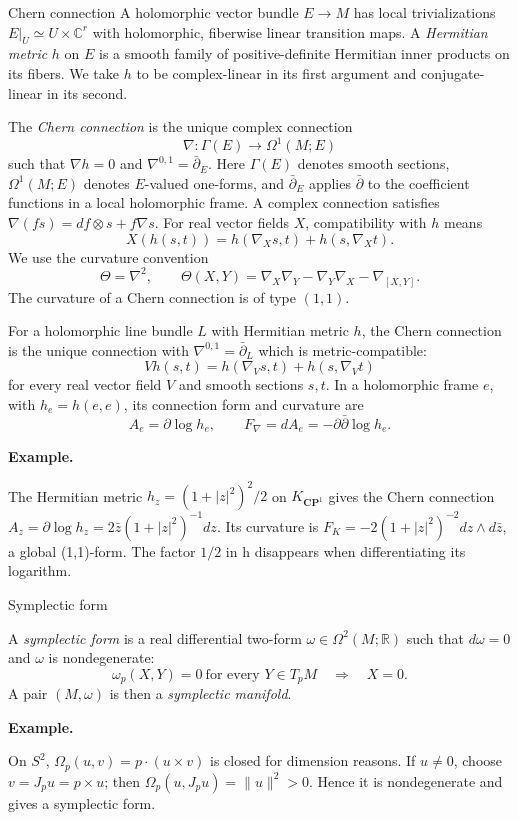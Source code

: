 \documentclass[11pt]{article}
\makeatletter
\newcommand{\R}{\mathbb R}
\newcommand{\C}{\mathbb C}
\newcounter{definition}
\newcommand{\CP}{\mathbf{CP}}
\newcommand{\exampleheading}{\par\medskip\textbf{Example.}\par\smallskip}
\newcommand{\currentdefinition}[1]{\protected@edef\@currentlabel{#1}}
\makeatother
\begin{document}
\begin{definitionbox}{Chern connection}
\currentdefinition{\thedefinition}
\label{source:S16}
\label{def:N30}
A holomorphic vector bundle $E\to M$ has local trivializations
$E|_U\simeq U\times\C^r$ with holomorphic, fiberwise linear transition maps.
A \emph{Hermitian metric} $h$ on $E$ is a smooth family of positive-definite
Hermitian inner products on its fibers. We take $h$ to be complex-linear
in its first argument and conjugate-linear in its second.

The \emph{Chern connection} is the unique complex connection
\[
\nabla:\Gamma(E)\longrightarrow\Omega^1(M;E)
\]
such that $\nabla h=0$ and $\nabla^{0,1}=\bar\partial_E$.
Here $\Gamma(E)$ denotes smooth sections, $\Omega^1(M;E)$ denotes
$E$-valued one-forms, and $\bar\partial_E$ applies $\bar\partial$ to the
coefficient functions in a local holomorphic frame.
A complex connection satisfies $\nabla(fs)=df\otimes s+f\nabla s$.
For real vector fields $X$, compatibility with $h$ means
\[
X(h(s,t))=h(\nabla_Xs,t)+h(s,\nabla_Xt).
\]
We use the curvature convention
\[
\Theta=\nabla^2,\qquad
\Theta(X,Y)=\nabla_X\nabla_Y-\nabla_Y\nabla_X-\nabla_{[X,Y]}.
\]
The curvature of a Chern connection is of type $(1,1)$.


For a holomorphic line bundle $L$ with Hermitian metric $h$, the Chern connection is the unique connection with $\nabla^{0,1}=\bar\partial_L$ which is metric-compatible:
\[Vh(s,t)=h(\nabla_Vs,t)+h(s,\nabla_Vt)\]
for every real vector field $V$ and smooth sections $s,t$. In a holomorphic frame $e$, with $h_e=h(e,e)$, its connection form and curvature are
\[A_e=\partial\log h_e,\qquad F_\nabla=dA_e=-\partial\bar\partial\log h_e.\]

\exampleheading
The Hermitian metric $h_z=(1+|z|^2)^2/2$ on $K_{\CP^1}$ gives the Chern connection $A_z=\partial\log h_z=2\bar z(1+|z|^2)^{-1}dz$. Its curvature is $F_K=-2(1+|z|^2)^{-2}dz\wedge d\bar z$, a global (1,1)-form. The factor $1/2$ in h disappears when differentiating its logarithm.
\end{definitionbox}

\begin{definitionbox}{Symplectic form}
\currentdefinition{\thedefinition}
\label{source:S17}

A \emph{symplectic form} is a real differential two-form
$\omega\in\Omega^2(M;\R)$ such that $d\omega=0$ and $\omega$ is
nondegenerate:
\[
\omega_p(X,Y)=0\ \text{for every }Y\in T_pM
\quad\Longrightarrow\quad X=0.
\]
A pair $(M,\omega)$ is then a \emph{symplectic manifold}.


\exampleheading
On $S^2$, $\Omega_p(u,v)=p\cdot(u\times v)$ is closed for dimension reasons. If $u\ne0$, choose $v=J_pu=p\times u$; then $\Omega_p(u,J_pu)=\|u\|^2>0$. Hence it is nondegenerate and gives a symplectic form.
\end{definitionbox}
\end{document}
